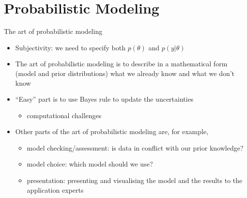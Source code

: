 \documentclass[10pt]{beamer}
\begin{document}
\section{Probabilistic Modeling}
\frame{\sectionpage}

\begin{frame}{The art of probabilistic modeling}
  \begin{itemize}
  \item Subjectivity: we need to specify both $p(\theta)$ and $p(y|\theta)$
  \item The art of probabilistic modeling is to describe in a
    mathematical form (model and prior distributions) what we already
    know and what we don't know
\vspace{\baselineskip}
  \item<2-> ``Easy'' part is to use Bayes rule to update the uncertainties
    \begin{itemize}
    \item computational challenges
    \end{itemize}
\vspace{\baselineskip}
  \item<3-> Other parts of the art of probabilistic modeling are, for example,
    \begin{itemize}
    \item model checking/assessment: is data in conflict with our prior knowledge?
    \item model choice: which model should we use?
    \item presentation: presenting and visualising the model and the results to the application experts
    \end{itemize}
  \end{itemize}
\end{frame}
\end{document}
